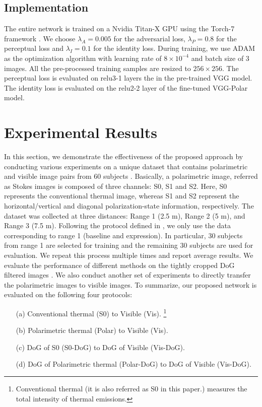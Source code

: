 \documentclass[10pt,twocolumn,letterpaper]{article}
\begin{document}
 
\subsection{Implementation}
The entire network is trained on a Nvidia Titan-X  GPU using the Torch-7 framework \cite{torch}. We choose $\lambda_A=0.005$ for the adversarial loss,  $\lambda_P=0.8$  for the perceptual loss and  $\lambda_I=0.1$ for the identity loss. During training, we use ADAM \cite{adam_opt} as the optimization algorithm with learning rate  of $8\times 10^{-4}$ and batch size of  3 images.  All the pre-processed training samples are resized to $256\times 256$. The perceptual loss is evaluated on relu3-1 layers the in the pre-trained VGG \cite{vggface} model.  The identity loss is evaluated on the relu2-2 layer of the fine-tuned VGG-Polar model.  


\section{Experimental Results}
In this section, we demonstrate the effectiveness of the proposed approach by conducting various experiments on a unique dataset that contains polarimetric and visible image pairs from 60 subjects  \cite{ijcb_datasets2}.  Basically, a polarimetric image, referred as  Stokes images is composed of three channels: S0, S1 and S2. Here, S0 represents the conventional thermal image, whereas S1 and S2 represent the horizontal/vertical and diagonal polarization-state information, respectively.  The dataset was collected at three distances: Range 1 (2.5 m), Range 2 (5 m), and Range 3 (7.5 m).   Following the protocol defined in  \cite{btas_2016}, we only use the data corresponding to range 1 (baseline and expression).   In particular, 30 subjects from range 1 are selected for training and the remaining 30 subjects are used for evaluation.  We repeat this process multiple times and report average results.  We evaluate the performance of different methods on the tightly cropped DoG filtered images \cite{btas_2016}.   We also conduct another set of experiments to directly transfer the polarimetric images to visible images. To summarize, our proposed network is evaluated on the following four protocols: 
\begin{enumerate}[nolistsep]
\item[(a)] Conventional thermal (S0) to Visible (Vis). \footnote{Conventional thermal (it is also referred as S0 in this paper.) measures the total intensity of thermal emissions.}
\item[(b)] Polarimetric thermal (Polar) to Visible (Vis).
\item[(c)] DoG of S0 (S0-DoG) to DoG of Visible (Vis-DoG).
\item[(d)] DoG of Polarimetric thermal (Polar-DoG) to DoG of Visible (Vis-DoG).
\end{enumerate}
\end{document}
